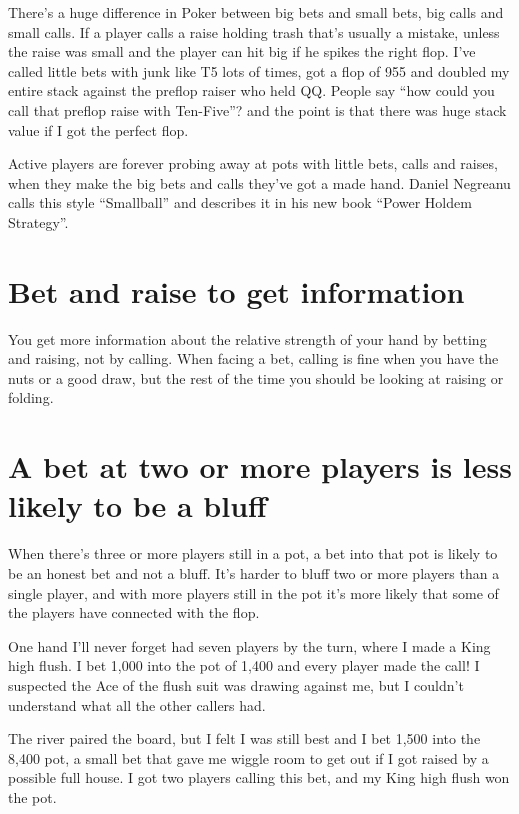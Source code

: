 There's a huge difference in Poker between big bets and small bets,
big calls and small calls. If a player calls a raise holding trash
that's usually a mistake, unless the raise was small and the player
can hit big if he spikes the right flop. I've called little bets
with junk like T5 lots of times, got a flop of 955 and doubled my entire
stack against the preflop raiser who held QQ. People say ``how could
you call that preflop raise with Ten-Five''? and the point is that
there was huge stack value if I got the perfect flop.

Active players are forever probing away at pots with little bets, calls
and raises, when they make the big bets and calls they've got a made hand.
Daniel Negreanu calls this style ``Smallball'' and describes it in his
new book ``Power Holdem Strategy''.

\section{Bet and raise to get information}

You get more information about the relative strength of your hand
by betting and raising, not by calling. When facing a bet, calling is
fine when you have the nuts or a good draw, but the rest of the time
you should be looking at raising or folding.

\section{A bet at two or more players is less likely to be a bluff}

When there's three or more players still in a pot, a bet into that
pot is likely to be an honest bet and not a bluff. It's harder to bluff
two or more players than a single player, and with more players still in
the pot it's more likely that some of the players have connected with
the flop.

One hand I'll never forget had seven players by the turn, where I made
a King high flush. I bet 1,000 into the pot of 1,400 and every player
made the call! I suspected the Ace of the flush suit was drawing against
me, but I couldn't understand what all the other callers had.

The river paired the board, but I felt I was still best and I bet
1,500 into the 8,400 pot, a small bet that gave me wiggle room to get
out if I got raised by a possible full house. I got two players calling
this bet, and my King high flush won the pot.

